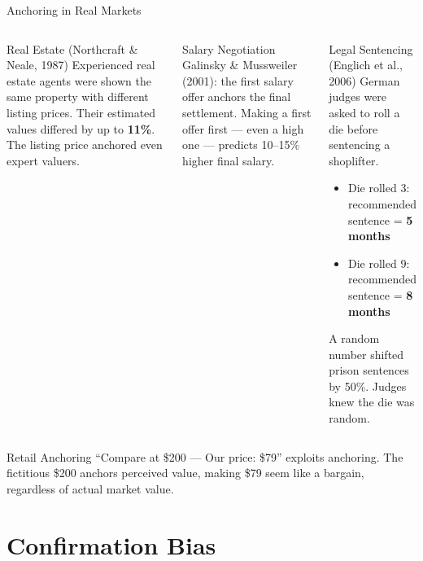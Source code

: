 \documentclass[aspectratio=169]{beamer}
\begin{document}
\begin{frame}{Anchoring in Real Markets}
\begin{columns}
\begin{exampleblock}{Real Estate (Northcraft \& Neale, 1987)}
Experienced real estate agents were shown the same property with different listing prices. Their estimated values differed by up to \textbf{11\%}. The listing price anchored even expert valuers.
\end{exampleblock}
\begin{exampleblock}{Salary Negotiation}
Galinsky \& Mussweiler (2001): the first salary offer anchors the final settlement. Making a first offer first --- even a high one --- predicts 10--15\% higher final salary.
\end{exampleblock}
\begin{exampleblock}{Legal Sentencing (Englich et al., 2006)}
German judges were asked to roll a die before sentencing a shoplifter.
\begin{itemize}
  \item Die rolled 3: recommended sentence = \textbf{5 months}
  \item Die rolled 9: recommended sentence = \textbf{8 months}
\end{itemize}
\alert{A random number shifted prison sentences by 50\%.} Judges knew the die was random.
\end{exampleblock}
\end{columns}
\medskip
\begin{block}{Retail Anchoring}
``Compare at \$200 --- Our price: \$79'' exploits anchoring. The fictitious \$200 anchors perceived value, making \$79 seem like a bargain, regardless of actual market value.
\end{block}
\end{frame}

\section{Confirmation Bias}
\end{document}
